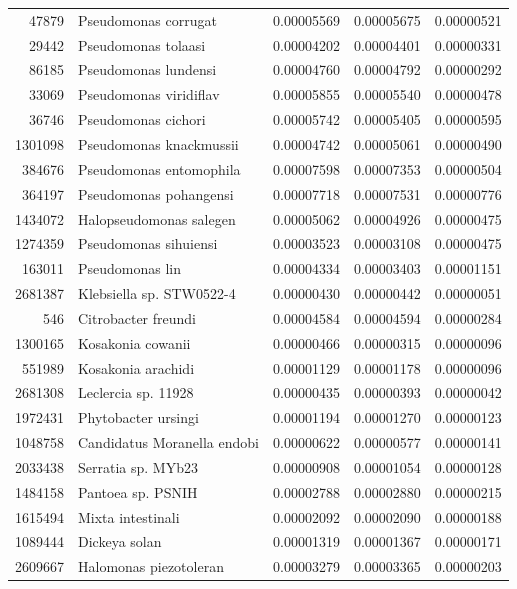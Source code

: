 \begin{table}[ht]
\begin{tabular}{rlrrr}
  47879 & Pseudomonas corrugat & 0.00005569 & 0.00005675 & 0.00000521 \\ 
  29442 & Pseudomonas tolaasi & 0.00004202 & 0.00004401 & 0.00000331 \\ 
  86185 & Pseudomonas lundensi & 0.00004760 & 0.00004792 & 0.00000292 \\ 
  33069 & Pseudomonas viridiflav & 0.00005855 & 0.00005540 & 0.00000478 \\ 
  36746 & Pseudomonas cichori & 0.00005742 & 0.00005405 & 0.00000595 \\ 
  1301098 & Pseudomonas knackmussii & 0.00004742 & 0.00005061 & 0.00000490 \\ 
  384676 & Pseudomonas entomophila & 0.00007598 & 0.00007353 & 0.00000504 \\ 
  364197 & Pseudomonas pohangensi & 0.00007718 & 0.00007531 & 0.00000776 \\ 
  1434072 & Halopseudomonas salegen & 0.00005062 & 0.00004926 & 0.00000475 \\ 
  1274359 & Pseudomonas sihuiensi & 0.00003523 & 0.00003108 & 0.00000475 \\ 
  163011 & Pseudomonas lin & 0.00004334 & 0.00003403 & 0.00001151 \\ 
  2681387 & Klebsiella sp. STW0522-4 & 0.00000430 & 0.00000442 & 0.00000051 \\ 
  546 & Citrobacter freundi & 0.00004584 & 0.00004594 & 0.00000284 \\ 
  1300165 & Kosakonia cowanii & 0.00000466 & 0.00000315 & 0.00000096 \\ 
  551989 & Kosakonia arachidi & 0.00001129 & 0.00001178 & 0.00000096 \\ 
  2681308 & Leclercia sp. 11928 & 0.00000435 & 0.00000393 & 0.00000042 \\ 
  1972431 & Phytobacter ursingi & 0.00001194 & 0.00001270 & 0.00000123 \\ 
  1048758 & Candidatus Moranella endobi & 0.00000622 & 0.00000577 & 0.00000141 \\ 
  2033438 & Serratia sp. MYb23 & 0.00000908 & 0.00001054 & 0.00000128 \\ 
  1484158 & Pantoea sp. PSNIH & 0.00002788 & 0.00002880 & 0.00000215 \\ 
  1615494 & Mixta intestinali & 0.00002092 & 0.00002090 & 0.00000188 \\ 
  1089444 & Dickeya solan & 0.00001319 & 0.00001367 & 0.00000171 \\ 
  2609667 & Halomonas piezotoleran & 0.00003279 & 0.00003365 & 0.00000203 \\ 

\end{tabular}
\end{table}
